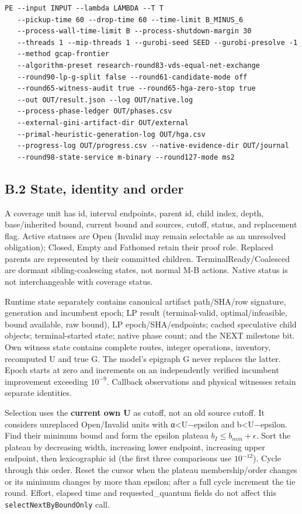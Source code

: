 \documentclass[
  american,
  11pt,
]{article}
\begin{document}
\begin{lstlisting}
PE --input INPUT --lambda LAMBDA --T T
   --pickup-time 60 --drop-time 60 --time-limit B_MINUS_6
   --process-wall-time-limit B --process-shutdown-margin 30
   --threads 1 --mip-threads 1 --gurobi-seed SEED --gurobi-presolve -1
   --method gcap-frontier
   --algorithm-preset research-round83-vds-equal-net-exchange
   --round90-lp-g-split false --round61-candidate-mode off
   --round65-witness-audit true --round65-hga-zero-stop true
   --out OUT/result.json --log OUT/native.log
   --process-phase-ledger OUT/phases.csv
   --external-gini-artifact-dir OUT/external
   --primal-heuristic-generation-log OUT/hga.csv
   --progress-log OUT/progress.csv --native-evidence-dir OUT/journal
   --round98-state-service m-binary --round127-mode ms2
\end{lstlisting}

\subsection{B.2 State, identity and
order}\label{b.2-state-identity-and-order}

A coverage unit has id, interval endpoints, parent id, child index,
depth, base/inherited bound, current bound and sources, cutoff, status,
and replacement flag. Active statuses are Open (Invalid may remain
selectable as an unresolved obligation); Closed, Empty and Fathomed
retain their proof role. Replaced parents are represented by their
committed children. TerminalReady/Coalesced are dormant
sibling-coalescing states, not normal M-B actions. Native status is not
interchangeable with coverage status.

Runtime state separately contains canonical artifact path/SHA/row
signature, generation and incumbent epoch; LP result (terminal-valid,
optimal/infeasible, bound available, raw bound), LP epoch/SHA/endpoints;
cached speculative child objects; terminal-started state; native phase
count; and the NEXT milestone bit. Own witness state contains complete
routes, integer operations, inventory, recomputed U and true G. The
model's epigraph G never replaces the latter. Epoch starts at zero and
increments on an independently verified incumbent improvement exceeding
\(10^{-9}\). Callback observations and physical witnesses retain
separate identities.

Selection uses the \textbf{current own U} as cutoff, not an old source
cutoff. It considers unreplaced Open/Invalid units with
α\textless U−epsilon and b\textless U−epsilon. Find their minimum bound
and form the epsilon plateau \(b_I\le b_{min}+\epsilon\). Sort the
plateau by decreasing width, increasing lower endpoint, increasing upper
endpoint, then lexicographic id (the first three comparisons use
\(10^{-12}\)). Cycle through this order. Reset the cursor when the
plateau membership/order changes or its minimum changes by more than
epsilon; after a full cycle increment the tie round. Effort, elapsed
time and requested\_\allowbreak{}quantum fields do not affect this
\texttt{selectNextByBoundOnly} call.
\end{document}
